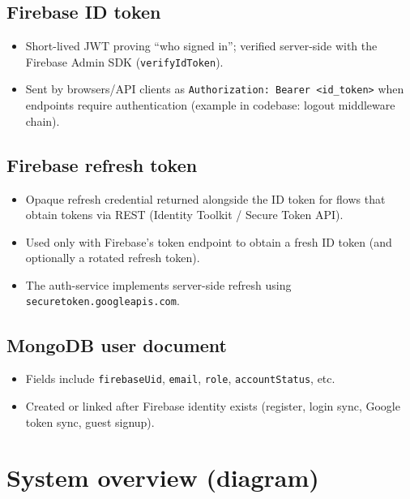 \documentclass[11pt,a4paper]{article}
\begin{document}
\subsection*{Firebase ID token}
\begin{itemize}[leftmargin=*]
  \item Short-lived JWT proving ``who signed in''; verified server-side with the Firebase Admin SDK
        (\texttt{verifyIdToken}).
  \item Sent by browsers/API clients as \texttt{Authorization: Bearer \textless{}id\_token\textgreater{}} when endpoints require authentication (example in codebase: logout middleware chain).
\end{itemize}

\subsection*{Firebase refresh token}
\begin{itemize}[leftmargin=*]
  \item Opaque refresh credential returned alongside the ID token for flows that obtain tokens via REST
        (Identity Toolkit / Secure Token API).
  \item Used only with Firebase's token endpoint to obtain a fresh ID token (and optionally a rotated refresh token).
  \item The auth-service implements server-side refresh using \texttt{securetoken.googleapis.com}.
\end{itemize}

\subsection*{MongoDB user document}
\begin{itemize}[leftmargin=*]
  \item Fields include \texttt{firebaseUid}, \texttt{email}, \texttt{role}, \texttt{accountStatus}, etc.
  \item Created or linked after Firebase identity exists (register, login sync, Google token sync, guest signup).
\end{itemize}

\section{System overview (diagram)}
\end{document}
